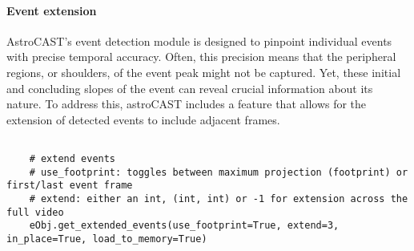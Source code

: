 
\paragraph{Event extension}
AstroCAST's event detection module is designed to pinpoint individual events with precise temporal accuracy. Often, this precision means that the peripheral regions, or shoulders, of the event peak might not be captured. Yet, these initial and concluding slopes of the event can reveal crucial information about its nature. To address this, astroCAST includes a feature that allows for the extension of detected events to include adjacent frames.

\begin{lstlisting}[style=pyStyle]

    # extend events
    # use_footprint: toggles between maximum projection (footprint) or first/last event frame
    # extend: either an int, (int, int) or -1 for extension across the full video
    eObj.get_extended_events(use_footprint=True, extend=3, in_place=True, load_to_memory=True)

\end{lstlisting}

